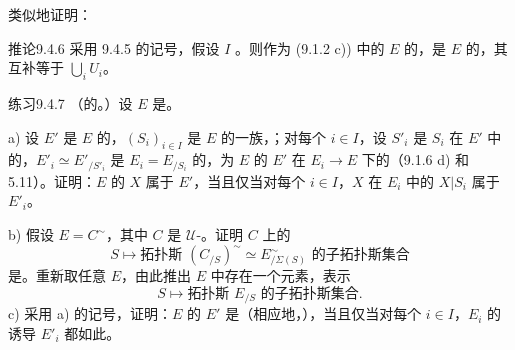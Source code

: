 类似地证明：
\begin{SGAresult}{推论}{9.4.6}
采用 9.4.5 的记号，假设 $I$ 。则作为 (9.1.2 c)) 中的 $E$ 的，是 $E$ 的，其互补等于 $\bigcup_iU_i$。
\end{SGAresult}
\begin{SGAresult}{练习}{9.4.7}
（的。）设 $E$ 是。

a) 设 $E'$ 是 $E$ 的，$(S_i)_{i\in I}$ 是 $E$ 的一族，；对每个 $i\in I$，设 $S'_i$ 是 $S_i$ 在 $E'$ 中的，$E'_i\simeq E'_{/S'_i}$ 是 $E_i=E_{/S_i}$ 的，为 $E$ 的 $E'$ 在 $E_i\to E$ 下的（9.1.6 d) 和 5.11）。证明：$E$ 的 $X$ 属于 $E'$，当且仅当对每个 $i\in I$，$X$ 在 $E_i$ 中的 $X|S_i$ 属于 $E'_i$。

b) 假设 $E=C^\sim$，其中 $C$ 是 $\mathcal U$-。证明 $C$ 上的
\[
S\longmapsto\text{拓扑斯 }(C_{/S})^\sim\simeq E^\sim_{/\Sigma(S)}\text{ 的子拓扑斯集合}
\]
是。重新取任意 $E$，由此推出 $E$ 中存在一个元素，表示
\[
S\longmapsto\text{拓扑斯 }E_{/S}\text{ 的子拓扑斯集合}.
\]
c) 采用 a) 的记号，证明：$E$ 的 $E'$ 是（相应地，），当且仅当对每个 $i\in I$，$E_i$ 的诱导 $E'_i$ 都如此。
\end{SGAresult}
